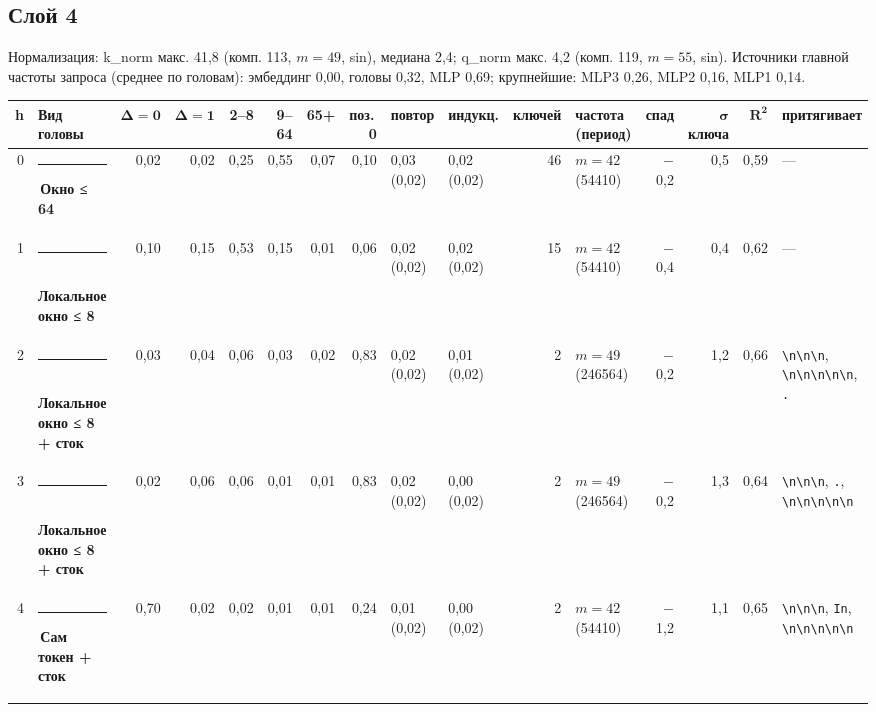 \documentclass[10pt]{article}
\begin{document}
\noindent\begin{minipage}{\linewidth}
\subsection*{Слой 4}
{\small\color{ink2} Нормализация: k\_norm макс. 41,8 (комп. 113, $m{=}49$, sin), медиана 2,4; q\_norm макс. 4,2 (комп. 119, $m{=}55$, sin). Источники главной частоты запроса (среднее по головам): эмбеддинг 0,00, головы 0,32, MLP 0,69; крупнейшие: MLP3 0,26, MLP2 0,16, MLP1 0,14.}
\begin{center}{\footnotesize\begin{tabular}{|r|l|r|r|r|r|r|r|l|l|r|l|r|r|r|l|}
\hline
\rowcolor{head}\textbf{h} & \textbf{Вид головы} & $\boldsymbol{\Delta{=}0}$ & $\boldsymbol{\Delta{=}1}$ & \textbf{2–8} & \textbf{9–64} & \textbf{65+} & \textbf{поз.\,0} & \textbf{повтор} & \textbf{индукц.} & \textbf{ключей} & \textbf{частота (период)} & \textbf{спад} & $\boldsymbol{\sigma}$ \textbf{ключа} & $\boldsymbol{R^2}$ & \textbf{притягивает} \\ \hline
0 & \textcolor[HTML]{EDA100}{\rule{0.62em}{0.62em}}\,\textbf{Окно ≤ 64} & 0,02 & 0,02 & 0,25 & 0,55 & 0,07 & 0,10 & 0,03 (0,02) & 0,02 (0,02) & 46 & $m{=}42$ (54410) & $-$0,2 & 0,5 & 0,59 & — \\ \hline
1 & \textcolor[HTML]{1BAF7A}{\rule{0.62em}{0.62em}}\,\textbf{Локальное окно ≤ 8} & 0,10 & 0,15 & 0,53 & 0,15 & 0,01 & 0,06 & 0,02 (0,02) & 0,02 (0,02) & 15 & $m{=}42$ (54410) & $-$0,4 & 0,4 & 0,62 & — \\ \hline
2 & \textcolor[HTML]{1BAF7A}{\rule{0.62em}{0.62em}}\,\textbf{Локальное окно ≤ 8 + сток} & 0,03 & 0,04 & 0,06 & 0,03 & 0,02 & 0,83 & 0,02 (0,02) & 0,01 (0,02) & 2 & $m{=}49$ (246564) & $-$0,2 & 1,2 & 0,66 & \texttt{\textvisiblespace{}\textbackslash{}n\textbackslash{}n\textbackslash{}n}, \texttt{\textvisiblespace{}\textbackslash{}n\textbackslash{}n\textbackslash{}n\textbackslash{}n\textbackslash{}n}, \texttt{\textvisiblespace{}.} \\ \hline
3 & \textcolor[HTML]{1BAF7A}{\rule{0.62em}{0.62em}}\,\textbf{Локальное окно ≤ 8 + сток} & 0,02 & 0,06 & 0,06 & 0,01 & 0,01 & 0,83 & 0,02 (0,02) & 0,00 (0,02) & 2 & $m{=}49$ (246564) & $-$0,2 & 1,3 & 0,64 & \texttt{\textvisiblespace{}\textbackslash{}n\textbackslash{}n\textbackslash{}n}, \texttt{\textvisiblespace{}.}, \texttt{\textvisiblespace{}\textbackslash{}n\textbackslash{}n\textbackslash{}n\textbackslash{}n\textbackslash{}n} \\ \hline
4 & \textcolor[HTML]{2A78D6}{\rule{0.62em}{0.62em}}\,\textbf{Сам токен + сток} & 0,70 & 0,02 & 0,02 & 0,01 & 0,01 & 0,24 & 0,01 (0,02) & 0,00 (0,02) & 2 & $m{=}42$ (54410) & $-$1,2 & 1,1 & 0,65 & \texttt{\textvisiblespace{}\textbackslash{}n\textbackslash{}n\textbackslash{}n}, \texttt{\textvisiblespace{}In}, \texttt{\textvisiblespace{}\textbackslash{}n\textbackslash{}n\textbackslash{}n\textbackslash{}n\textbackslash{}n} \\ \hline

\end{tabular}}
\end{center}
\end{minipage}
\end{document}
